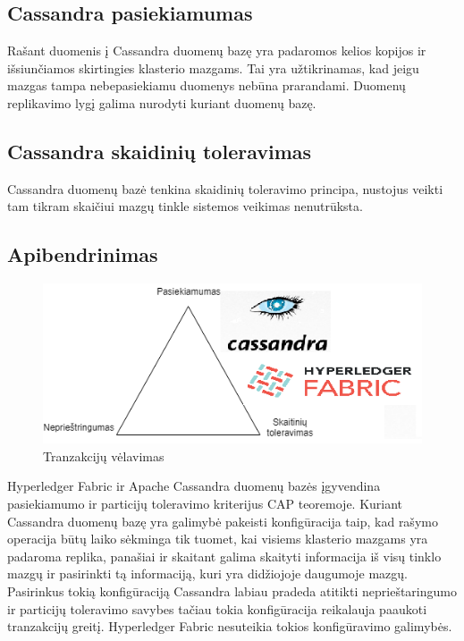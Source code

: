 \documentclass{VUMIFPSkursinis}
\begin{document}
	\subsection{Cassandra pasiekiamumas}
		Rašant duomenis į Cassandra duomenų bazę yra padaromos kelios kopijos ir išsiunčiamos skirtingies klasterio mazgams. Tai yra užtikrinamas, kad jeigu mazgas tampa nebepasiekiamu duomenys nebūna prarandami.\cite{CasDesk} Duomenų replikavimo lygį galima nurodyti kuriant duomenų bazę. 
	\subsection{Cassandra skaidinių toleravimas}
		Cassandra duomenų bazė tenkina skaidinių toleravimo principa, nustojus veikti tam tikram skaičiui mazgų tinkle sistemos veikimas nenutrūksta. \cite{CasDesk} 
	\subsection{Apibendrinimas}
		\begin{figure}[H]
		    \centering
		    \includegraphics[scale=1]{img/CAP}
		    \caption{Tranzakcijų vėlavimas}   %
		    \label{img:mlp}
		\end{figure}

		Hyperledger Fabric ir Apache Cassandra duomenų bazės įgyvendina pasiekiamumo ir particijų toleravimo kriterijus CAP teoremoje. Kuriant Cassandra duomenų bazę yra galimybė 
pakeisti konfigūracija taip, kad rašymo operacija būtų laiko sėkminga tik tuomet, kai visiems klasterio mazgams yra padaroma replika, panašiai ir skaitant galima skaityti informacija iš visų tinklo mazgų ir pasirinkti tą informaciją, kuri yra didžiojoje daugumoje mazgų. Pasirinkus tokią konfigūraciją Cassandra labiau pradeda atitikti neprieštaringumo ir particijų toleravimo savybes tačiau tokia konfigūracija reikalauja paaukoti  tranzakcijų greitį. Hyperledger Fabric nesuteikia tokios konfigūravimo galimybės.
\end{document}
